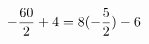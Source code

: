 \documentclass[preview]{standalone}
\begin{document}
\begin{align*}
\special{dvisvgm:raw <g id='unique000'>}-\frac{60}{2} + 4 = 8 (- \frac{5}{2}) - 6\special{dvisvgm:raw </g>}
\end{align*}
\end{document}
